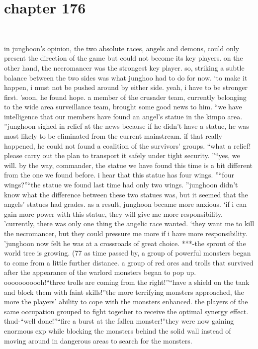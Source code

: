 \section{chapter 176}

                             




in junghoon’s opinion, the two absolute races, angels and demons, could only present the direction of the game but could not become its key players.
 on the other hand, the necromancer was the strongest key player.
so, striking a subtle balance between the two sides was what junghoo had to do for now.
‘to make it happen, i must not be pushed around by either side.
 yeah, i have to be stronger first.
’soon, he found hope.
 a member of the crusader team, currently belonging to the wide area surveillance team, brought some good news to him.
“we have intelligence that our members have found an angel’s statue in the kimpo area.
”junghoon sighed in relief at the news because if he didn’t have a statue, he was most likely to be eliminated from the current mainstream.
 if that really happened, he could not found a coalition of the survivors’ groups.
“what a relief! please carry out the plan to transport it safely under tight security.
”“yes, we will.
 by the way, commander, the statue we have found this time is a bit different from the one we found before.
 i hear that this statue has four wings.
”“four wings?”“the statue we found last time had only two wings.
”junghoon didn’t know what the difference between these two statues was, but it seemed that the angels’ statues had grades.
 as a result, junghoon became more anxious.
‘if i can gain more power with this statue, they will give me more responsibility.
’currently, there was only one thing the angelic race wanted.
‘they want me to kill the necromancer, but they could pressure me more if i have more responsibility.
’junghoon now felt he was at a crossroads of great choice.
***-the sprout of the world tree is growing.
 (77%
as time passed by, a group of powerful monsters began to come from a little further distance.
 a group of red orcs and trolls that survived after the appearance of the warlord monsters began to pop up.
ooooooooooh!“three trolls are coming from the right!”“have a shield on the tank and block them with faint skills!”the more terrifying monsters approached, the more the players’ ability to cope with the monsters enhanced.
 the players of the same occupation grouped to fight together to receive the optimal synergy effect.
thud-“well done!”“fire a burst at the fallen monster!”they were now gaining enormous exp while blocking the monsters behind the solid wall instead of moving around in dangerous areas to search for the monsters.
